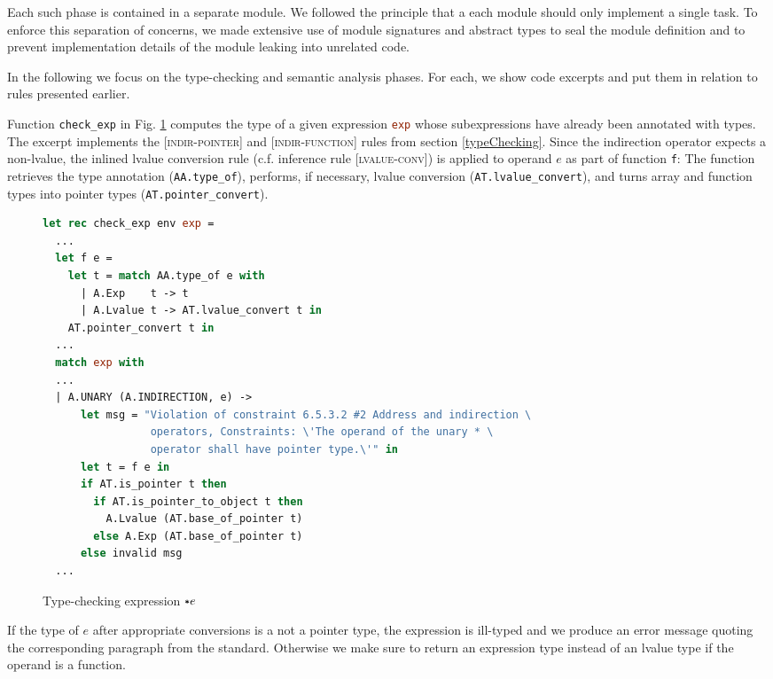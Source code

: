 \documentclass[a4paper,12pt]{scrbook}
\theoremstyle{plain}
\theoremstyle{definition}
\newcommand{\cc}[1]{{\text{\footnotesize\ttfamily{#1}}}}
\begin{document}
Each such phase is contained in a separate module. We followed the principle
that a each module should only implement a single task. To enforce this
separation of concerns, we made extensive use of module signatures and abstract
types to seal the module definition and to prevent implementation details of the
module leaking into unrelated code.

In the following we focus on the type-checking and semantic analysis phases. For
each, we show code excerpts and put them in relation to rules presented earlier.

Function \lstinline[language=ML]{check_exp} in Fig. \ref{codeTypeChecking}
computes the type of a given expression \lstinline[language=ML]{exp} whose
subexpressions have already been annotated with types. The excerpt implements
the \textsc{[indir-pointer]} and \textsc{[indir-function]} rules from section
\ref{typeChecking}. Since the indirection operator expects a non-lvalue, the
inlined lvalue conversion rule (c.f. inference rule \textsc{[lvalue-conv]}) is
applied to operand $e$ as part of function \lstinline[language=ML]{f}: The
function retrieves the type annotation (\lstinline[language=ML]{AA.type_of}),
performs, if necessary, lvalue conversion
(\lstinline[language=ML]{AT.lvalue_convert}), and turns array and function types
into pointer types (\lstinline[language=ML]{AT.pointer_convert}).
\begin{figure}[htb]
\begin{lstlisting}[language=ML,frame=tblr]
let rec check_exp env exp =
  ...
  let f e =
    let t = match AA.type_of e with
      | A.Exp    t -> t
      | A.Lvalue t -> AT.lvalue_convert t in
    AT.pointer_convert t in
  ...
  match exp with
  ...
  | A.UNARY (A.INDIRECTION, e) ->
      let msg = "Violation of constraint 6.5.3.2 #2 Address and indirection \
                 operators, Constraints: \'The operand of the unary * \
                 operator shall have pointer type.\'" in
      let t = f e in
      if AT.is_pointer t then
        if AT.is_pointer_to_object t then
          A.Lvalue (AT.base_of_pointer t)
        else A.Exp (AT.base_of_pointer t)
      else invalid msg
  ...
\end{lstlisting}
\caption{Type-checking expression $\cc{*}e$}\label{codeTypeChecking}
\end{figure}
If the type of $e$ after appropriate conversions is a not a pointer type, the
expression is ill-typed and we produce an error message quoting the
corresponding paragraph from the standard. Otherwise we make sure to return an
expression type instead of an lvalue type if the operand is a function.
\end{document}
